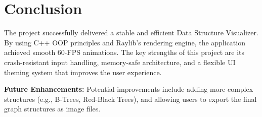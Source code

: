 \section{Conclusion}

The project successfully delivered a stable and efficient Data Structure Visualizer. By using C++ OOP principles and Raylib's rendering engine, the application achieved smooth 60-FPS animations. The key strengths of this project are its crash-resistant input handling, memory-safe architecture, and a flexible UI theming system that improves the user experience.

\textbf{Future Enhancements:} Potential improvements include adding more complex structures (e.g., B-Trees, Red-Black Trees), and allowing users to export the final graph structures as image files.